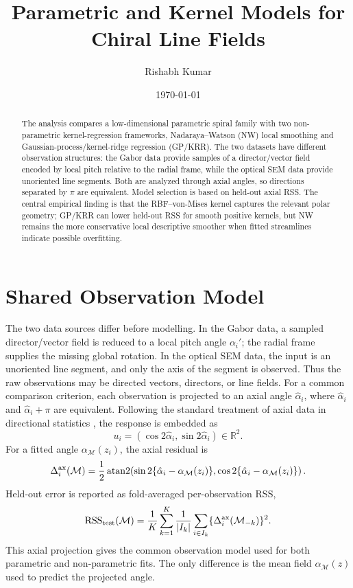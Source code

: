 \documentclass[10pt]{article}
\title{Parametric and Kernel Models for Chiral Line Fields}
\author{Rishabh Kumar}
\date{\today}
\begin{document}
\maketitle

\begin{abstract}
The analysis compares a low-dimensional parametric spiral family with two non-parametric kernel-regression frameworks, Nadaraya--Watson (NW) local smoothing and Gaussian-process/kernel-ridge regression (GP/KRR).  The two datasets have different observation structures: the Gabor data provide samples of a director/vector field encoded by local pitch relative to the radial frame, while the optical SEM data provide unoriented line segments.  Both are analyzed through axial angles, so directions separated by $\pi$ are equivalent.  Model selection is based on held-out axial RSS.  The central empirical finding is that the RBF--von-Mises kernel captures the relevant polar geometry; GP/KRR can lower held-out RSS for smooth positive kernels, but NW remains the more conservative local descriptive smoother when fitted streamlines indicate possible overfitting.
\end{abstract}

\section{Shared Observation Model}
The two data sources differ before modelling.  In the Gabor data, a sampled director/vector field is reduced to a local pitch angle $\alpha_i'$; the radial frame supplies the missing global rotation.  In the optical SEM data, the input is an unoriented line segment, and only the axis of the segment is observed.  Thus the raw observations may be directed vectors, directors, or line fields.  For a common comparison criterion, each observation is projected to an axial angle $\hat\alpha_i$, where $\hat\alpha_i$ and $\hat\alpha_i+\pi$ are equivalent.  Following the standard treatment of axial data in directional statistics \cite{mardia2000}, the response is embedded as
\begin{equation}
  u_i=(\cos 2\hat\alpha_i,\sin 2\hat\alpha_i)\in\mathbb R^2.
  \label{eq:embedding}
\end{equation}
For a fitted angle $\alpha_{\mathcal M}(z_i)$, the axial residual is
\begin{equation}
  \Delta_i^{\rm ax}(\mathcal M)
  =
  \frac12\operatorname{atan2}\!\left(
    \sin 2\{\hat\alpha_i-\alpha_{\mathcal M}(z_i)\},
    \cos 2\{\hat\alpha_i-\alpha_{\mathcal M}(z_i)\}
  \right).
  \label{eq:axial-residual}
\end{equation}
Held-out error is reported as fold-averaged per-observation RSS,
\begin{equation}
  {\rm RSS}_{\rm test}(\mathcal M)=
  \frac1K\sum_{k=1}^K\frac1{|I_k|}
  \sum_{i\in I_k}\{\Delta_i^{\rm ax}(\mathcal M_{-k})\}^2.
  \label{eq:test-rss}
\end{equation}
This axial projection gives the common observation model used for both parametric and non-parametric fits.  The only difference is the mean field $\alpha_{\mathcal M}(z)$ used to predict the projected angle.
\end{document}
